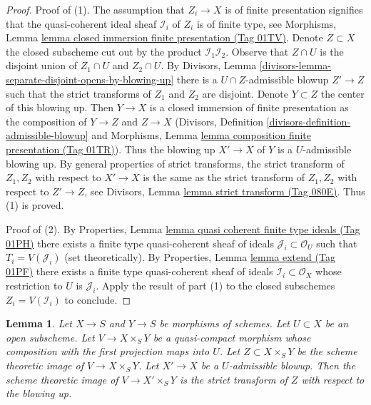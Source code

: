 \documentclass{amsart}
\theoremstyle{plain}
\newtheorem{lemma}[subsection]{Lemma}
\theoremstyle{definition}
\theoremstyle{remark}
\numberwithin{equation}{subsection}
\begin{document}
\begin{proof}
Proof of (1). The assumption that $Z_i \to X$ is of finite presentation
signifies that the quasi-coherent ideal sheaf $\mathcal{I}_i$ of $Z_i$
is of finite type, see 
Morphisms, Lemma \href{https://stacks.math.columbia.edu/tag/01TV}{lemma closed immersion finite presentation (Tag 01TV)}.
Denote $Z \subset X$ the closed subscheme
cut out by the product $\mathcal{I}_1 \mathcal{I}_2$.
Observe that $Z \cap U$ is the disjoint union
of $Z_1 \cap U$ and $Z_2 \cap U$. By Divisors, Lemma
\ref{divisors-lemma-separate-disjoint-opens-by-blowing-up}
there is a $U \cap Z$-admissible blowup $Z' \to Z$ such that
the strict transforms of $Z_1$ and $Z_2$ are disjoint.
Denote $Y \subset Z$ the center of this blowing up.
Then $Y \to X$ is a closed immersion of finite presentation as the composition
of $Y \to Z$ and $Z \to X$ (Divisors, Definition
\ref{divisors-definition-admissible-blowup}
and Morphisms, Lemma \href{https://stacks.math.columbia.edu/tag/01TR}{lemma composition finite presentation (Tag 01TR)}).
Thus the blowing up $X' \to X$ of $Y$ is a $U$-admissible blowing
up. By general properties of strict transforms, the
strict transform of $Z_1, Z_2$ with respect to $X' \to X$
is the same as the strict transform of $Z_1, Z_2$ with respect
to $Z' \to Z$, see
Divisors, Lemma \href{https://stacks.math.columbia.edu/tag/080E}{lemma strict transform (Tag 080E)}.
Thus (1) is proved.

\medskip\noindent
Proof of (2). By Properties, Lemma
\href{https://stacks.math.columbia.edu/tag/01PH}{lemma quasi coherent finite type ideals (Tag 01PH)}
there exists a finite type quasi-coherent sheaf of ideals
$\mathcal{J}_i \subset \mathcal{O}_U$ such that
$T_i = V(\mathcal{J}_i)$ (set theoretically).
By Properties, Lemma \href{https://stacks.math.columbia.edu/tag/01PF}{lemma extend (Tag 01PF)}
there exists a finite type quasi-coherent sheaf
of ideals $\mathcal{I}_i \subset \mathcal{O}_X$
whose restriction to $U$ is $\mathcal{J}_i$.
Apply the result of part (1) to the closed
subschemes $Z_i = V(\mathcal{I}_i)$ to conclude.
\end{proof}


\begin{lemma}
\label{lemma-replaced-by-strict-transform}
Let $X \to S$ and $Y \to S$ be morphisms of schemes.
Let $U \subset X$ be an open subscheme.
Let $V \to X \times_S Y$ be a quasi-compact morphism
whose composition with the first projection maps into $U$.
Let $Z \subset X \times_S Y$ be the scheme theoretic image of
$V \to X \times_S Y$. Let $X' \to X$ be a $U$-admissible blowup.
Then the scheme theoretic image of $V \to X' \times_S Y$ is the
strict transform of $Z$ with respect to the blowing up.
\end{lemma}
\end{document}
